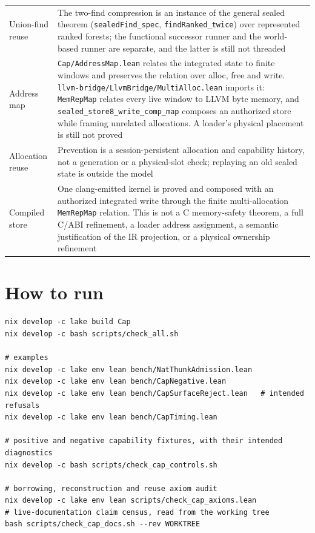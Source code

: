 \documentclass[10pt,a4paper]{article}
\newcommand{\file}[1]{\texttt{\small #1}}
\begin{document}
\begin{center}
\begin{tabular}{@{}lp{}@{}}
Union-find reuse & The two-find compression is an instance of the general sealed theorem (\texttt{sealedFind\_spec}, \texttt{findRanked\_twice}) over represented ranked forests; the functional successor runner and the world-based runner are separate, and the latter is still not threaded \\
Address map & \file{Cap/AddressMap.lean} relates the integrated state to finite windows and preserves the relation over alloc, free and write. \file{llvm-bridge/LlvmBridge/MultiAlloc.lean} imports it: \texttt{MemRepMap} relates every live window to LLVM byte memory, and \texttt{sealed\_store8\_write\_comp\_map} composes an authorized store while framing unrelated allocations. A loader's physical placement is still not proved \\
Allocation reuse & Prevention is a session-persistent allocation and capability history, not a generation or a physical-slot check; replaying an old sealed state is outside the model \\
Compiled store & One clang-emitted kernel is proved and composed with an authorized integrated write through the finite multi-allocation \texttt{MemRepMap} relation. This is not a C memory-safety theorem, a full C/ABI refinement, a loader address assignment, a semantic justification of the IR projection, or a physical ownership refinement \\
\bottomrule
\end{tabular}
\end{center}

\section{How to run}

\begin{lstlisting}[style=out]
nix develop -c lake build Cap
nix develop -c bash scripts/check_all.sh

# examples
nix develop -c lake env lean bench/NatThunkAdmission.lean
nix develop -c lake env lean bench/CapNegative.lean
nix develop -c lake env lean bench/CapSurfaceReject.lean   # intended refusals
nix develop -c lake env lean bench/CapTiming.lean

# positive and negative capability fixtures, with their intended diagnostics
nix develop -c bash scripts/check_cap_controls.sh

# borrowing, reconstruction and reuse axiom audit
nix develop -c lake env lean scripts/check_cap_axioms.lean
# live-documentation claim census, read from the working tree
bash scripts/check_cap_docs.sh --rev WORKTREE
\end{lstlisting}
\end{document}
